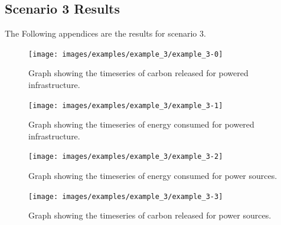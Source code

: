\documentclass{l4proj}
\begin{document}
\begin{appendices}
\section{Scenario 3 Results}\label{apen:subsec:scen3}
The Following appendices are the results for scenario 3.
\clearpage
\begin{figure}[htbp]
    \centering
    \texttt{[image: images/examples/example\_3/example\_3-0]}
    ~
    \caption{Graph showing the timeseries of carbon released for powered infrastructure.}
    \label{fig:example3-0}
\end{figure}
\clearpage
\begin{figure}[htbp]
    \centering
    \texttt{[image: images/examples/example\_3/example\_3-1]}
    ~
    \caption{Graph showing the timeseries of energy consumed for powered infrastructure.}
    \label{fig:example3-1}
\end{figure}
\clearpage
\begin{figure}[htbp]
    \centering
    \texttt{[image: images/examples/example\_3/example\_3-2]}
    ~
    \caption{Graph showing the timeseries of energy consumed for power sources.}
    \label{fig:example3-2}
\end{figure}
\clearpage
\begin{figure}[htbp]
    \centering
    \texttt{[image: images/examples/example\_3/example\_3-3]}
    ~
    \caption{Graph showing the timeseries of carbon released for power sources.}
    \label{fig:example3-3}
\end{figure}

\clearpage

\end{appendices}
\end{document}
